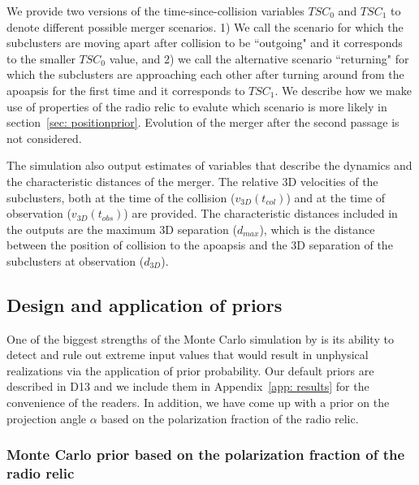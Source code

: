 We provide two versions of the time-since-collision variables $TSC_0$ and
$TSC_1$ to denote different possible merger scenarios. 1) We call the scenario for which the subclusters are
moving apart after collision to be ``outgoing" and it corresponds to the
smaller $TSC_0$ value, and 2) we call the alternative scenario 
``returning" for which the subclusters are approaching each other after turning
around from the apoapsis for the first time and it corresponds to $TSC_1$.
We describe how we make use of properties of the radio relic to evalute
which scenario is more likely in
section~\ref{sec: positionprior}. Evolution of the merger after the second
passage is not considered.
 
The simulation also output estimates of variables that describe
the dynamics and the characteristic distances of the merger. The relative
3D velocities of the subclusters, both at the time of the
collision ($v_{3D}(t_{col})$) and at the time of observation
($v_{3D}(t_{obs})$) are provided. The characteristic
distances included in the outputs are the maximum 3D separation ($d_{max}$),
which is the distance between the position of collision to
the apoapsis and the 3D separation of the subclusters at observation
($d_{3D}$). 
\subsection{Design and application of priors} 
\label{sec:priors}
%
One of the biggest strengths of the Monte Carlo simulation by  is its ability
to detect and rule out extreme input values that would result in
unphysical realizations via the application of prior probability. 
Our default priors are described in D13 and we include them in Appendix~\ref{app: results} for the convenience of the readers. 
In addition, we have come up with a prior on the projection angle $\alpha$
based on the polarization fraction of the radio relic.

\subsubsection{Monte Carlo prior based on the polarization fraction of the radio relic}
%

